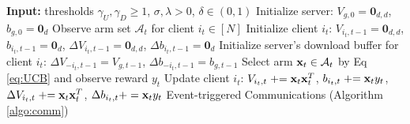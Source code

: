 \begin{algorithm}[h]
    \caption{\modelone{}} \label{algo:AsyncLinUCB}
  \begin{algorithmic}[1]
    \STATE \textbf{Input:} thresholds $\gamma_{U}, \gamma_{D} \geq 1$, $\sigma, \lambda > 0$, $\delta \in (0,1)$
    \STATE Initialize server: ${V}_{g, 0}=\textbf{0}_{d,d}$, ${b}_{g,0}=\textbf{0}_{d}$
        \STATE Observe arm set $\mathcal{A}_{t}$ for client $i_{t} \in [N]$
            \STATE Initialize client $i_{t}$: ${V}_{i_{t}, t-1}=\textbf{0}_{d,d}$, ${b}_{i_{t},t-1}=\textbf{0}_{d}$, $\Delta{V}_{i_{t}, t-1}=\textbf{0}_{d,d} $, $\Delta{b}_{i_{t},t-1}=\textbf{0}_{d}$
            \STATE Initialize server's download buffer for client $i_{t}$: $\Delta{V}_{-i_{t}, t-1}=V_{g,t-1}$, $\Delta{b}_{-i_{t},t-1}=b_{g,t-1}$
        \ENDIF
        \STATE Select arm $\mathbf{x}_{t}\in\mathcal{A}_{t}$ by Eq \eqref{eq:UCB} and observe reward $y_{t}$
        \STATE Update client $i_{t}$:
            ${V}_{i_{t},t} \mathrel{+}= \mathbf{x}_{t}\mathbf{x}_{t}^{T}$, ${b}_{i_{t},t} \mathrel{+}= \mathbf{x}_{t}y_{t}$, $\Delta{V}_{i_{t},t} \mathrel{+}= \mathbf{x}_{t}\mathbf{x}_{t}^{T}$, $\Delta{b}_{i_{t},t}+=\mathbf{x}_{t}y_{t}$
        \STATE Event-triggered Communications (Algorithm \ref{algo:comm})


\end{algorithmic}
\end{algorithm}
